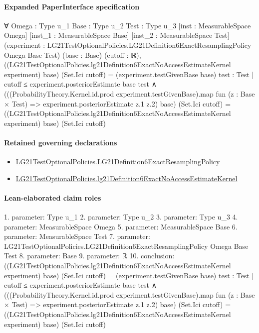\documentclass[10pt]{article}
\begin{document}
\paragraph{Expanded PaperInterface specification}
\begin{ReviewVerbatim}
∀ {Omega : Type u_1} {Base : Type u_2} {Test : Type u_3} [inst : MeasurableSpace Omega] [inst_1 : MeasurableSpace Base]
  [inst_2 : MeasurableSpace Test]
  (experiment : LG21TestOptionalPolicies.LG21Definition6ExactResamplingPolicy Omega Base Test) (base : Base)
  (cutoff : ℝ),
  ((LG21TestOptionalPolicies.lg21Definition6ExactNoAccessEstimateKernel experiment) base) (Set.Ici cutoff) =
      (experiment.testGivenBase base) {test : Test | cutoff ≤ experiment.posteriorEstimate base test} ∧
    (((ProbabilityTheory.Kernel.id.prod experiment.testGivenBase).map fun (z : Base × Test) =>
            experiment.posteriorEstimate z.1 z.2)
          base)
        (Set.Ici cutoff) =
      ((LG21TestOptionalPolicies.lg21Definition6ExactNoAccessEstimateKernel experiment) base) (Set.Ici cutoff)
\end{ReviewVerbatim}

\paragraph{Retained governing declarations}
\begin{itemize}\raggedright
\item \hyperlink{paper-prerequisite-13a547d7f13d2442}{LG21\allowbreak{}Test\allowbreak{}Optional\allowbreak{}Policies.\allowbreak{}LG21\allowbreak{}Definition6\allowbreak{}Exact\allowbreak{}Resampling\allowbreak{}Policy}
\item \hyperlink{paper-prerequisite-46c9d7765ef7c554}{LG21\allowbreak{}Test\allowbreak{}Optional\allowbreak{}Policies.\allowbreak{}lg21\allowbreak{}Definition6\allowbreak{}Exact\allowbreak{}No\allowbreak{}Access\allowbreak{}Estimate\allowbreak{}Kernel}
\end{itemize}
\paragraph{Lean-elaborated claim roles}\begin{ReviewVerbatim}
1. parameter: Type u_1
2. parameter: Type u_2
3. parameter: Type u_3
4. parameter: MeasurableSpace Omega
5. parameter: MeasurableSpace Base
6. parameter: MeasurableSpace Test
7. parameter: LG21TestOptionalPolicies.LG21Definition6ExactResamplingPolicy Omega Base Test
8. parameter: Base
9. parameter: ℝ
10. conclusion: ((LG21TestOptionalPolicies.lg21Definition6ExactNoAccessEstimateKernel experiment) base) (Set.Ici cutoff) =
    (experiment.testGivenBase base) {test : Test | cutoff ≤ experiment.posteriorEstimate base test} ∧
  (((ProbabilityTheory.Kernel.id.prod experiment.testGivenBase).map fun (z : Base × Test) =>
          experiment.posteriorEstimate z.1 z.2)
        base)
      (Set.Ici cutoff) =
    ((LG21TestOptionalPolicies.lg21Definition6ExactNoAccessEstimateKernel experiment) base) (Set.Ici cutoff)
\end{ReviewVerbatim}
\end{document}
